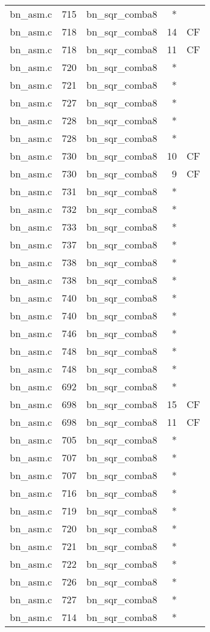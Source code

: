 \begin{table*}
\begin{tabular}{clrrr}
bn\_asm.c&715&bn\_sqr\_comba8&*&\\
bn\_asm.c&718&bn\_sqr\_comba8&14&CF\\
bn\_asm.c&718&bn\_sqr\_comba8&11&CF\\
bn\_asm.c&720&bn\_sqr\_comba8&*&\\
bn\_asm.c&721&bn\_sqr\_comba8&*&\\
bn\_asm.c&727&bn\_sqr\_comba8&*&\\
bn\_asm.c&728&bn\_sqr\_comba8&*&\\
bn\_asm.c&728&bn\_sqr\_comba8&*&\\
bn\_asm.c&730&bn\_sqr\_comba8&10&CF\\
bn\_asm.c&730&bn\_sqr\_comba8&9 &CF\\
bn\_asm.c&731&bn\_sqr\_comba8&*&\\
bn\_asm.c&732&bn\_sqr\_comba8&*&\\
bn\_asm.c&733&bn\_sqr\_comba8&*&\\
bn\_asm.c&737&bn\_sqr\_comba8&*&\\
bn\_asm.c&738&bn\_sqr\_comba8&*&\\
bn\_asm.c&738&bn\_sqr\_comba8&*&\\
bn\_asm.c&740&bn\_sqr\_comba8&*&\\
bn\_asm.c&740&bn\_sqr\_comba8&*&\\
bn\_asm.c&746&bn\_sqr\_comba8&*&\\
bn\_asm.c&748&bn\_sqr\_comba8&*&\\
bn\_asm.c&748&bn\_sqr\_comba8&*&\\
bn\_asm.c&692&bn\_sqr\_comba8&*&\\
bn\_asm.c&698&bn\_sqr\_comba8&15&CF\\
bn\_asm.c&698&bn\_sqr\_comba8&11&CF\\
bn\_asm.c&705&bn\_sqr\_comba8&*&\\
bn\_asm.c&707&bn\_sqr\_comba8&*&\\
bn\_asm.c&707&bn\_sqr\_comba8&*&\\
bn\_asm.c&716&bn\_sqr\_comba8&*&\\
bn\_asm.c&719&bn\_sqr\_comba8&*&\\
bn\_asm.c&720&bn\_sqr\_comba8&*&\\
bn\_asm.c&721&bn\_sqr\_comba8&*&\\
bn\_asm.c&722&bn\_sqr\_comba8&*&\\
bn\_asm.c&726&bn\_sqr\_comba8&*&\\
bn\_asm.c&727&bn\_sqr\_comba8&*&\\
bn\_asm.c&714&bn\_sqr\_comba8&*&\\

\end{tabular}
\end{table*}
